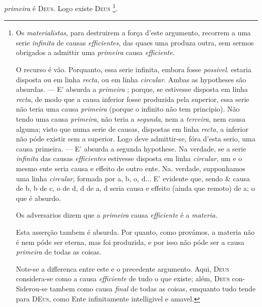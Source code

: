  \emph{primeira} é \textsc{Deus}. Logo existe \textsc{Deus} \footnote{Os \emph{materialistas}, para destruirem a força d'este argumento, recorrem a uma serie \emph{infinita} de causas \emph{efficientes}, das quaes uma produza outra, sem sermos obrigados a admittir uma \emph{primeira} causa \emph{efficiente}.\par O recurso é vão. Porquanto, essa serie infinita, embora fosse \emph{possivel}. estaria disposta ou em linha \emph{recta}, ou em linha \emph{circular}. Ambas as hypotheses são absurdas. --- E' absurda a \emph{primeira} ; porque, se estivesse disposta em linha \emph{recta}, de modo que a causa inferior fosse produzida pela superior, essa serie não teria uma causa \emph{primeira} (porque o infinito não tem principio). Não tendo uma causa \emph{primeira}, não teria a \emph{segunda}, nem a \emph{terceira}, nem causa alguma; visto que numa serie de causas, dispostas em linha \emph{recta}, a inferior não póde existir sem a superior. Logo deve admittir-se, fóra d'esta serio, uma causa primeira. --- E' absurda a segunda hypothese. Na verdade, se a serie \emph{infinita} das causas \emph{efficientes} estivesse disposta em linha \emph{circular}, um e o mesmo ente seria causa e effeito de outro ente. Na. verdade, supponhamos uma linha \emph{circular}, formada por a, b, o, d... E' evidente que, sendo \& causa de b, b de c, o de d, d de a, d seria causa e effeito (ainda que remoto) de a; o que é absurdo.\par Os adversarios dizem que a \emph{primeira} causa \emph{efficiente} é a \emph{materia}.\par Esta asserção tambem é absurda. Por quanto, como provámos, a materia não é nem póde ser eterna, mas foi produzida, e por isso não póde ser a causa \emph{primeira} de todas as coisas.\par Note-se a differenca entre este e o precedente argumento. Aqui, \textsc{Deus} considera-se como a causa \emph{efficiente} de tudo o que existe; além, \textsc{Deus} con- Siderou-se tambem como causa \emph{final} de todas as coisas, emquanto tudo tende para \textsc{DEus}, como Ente infinitamente intelligivel e amavel.}.

